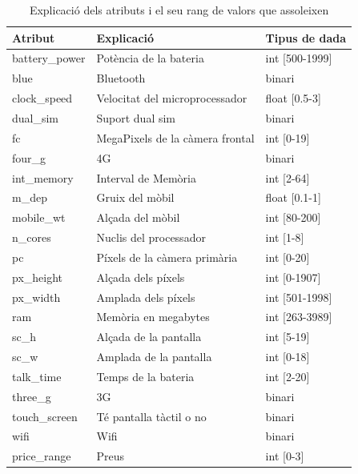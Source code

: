 \documentclass[a4paper, 11pt]{article}
\begin{document}
\begin{table}[h!]
    \centering
    \begin{tabular}{l|l|l}
        \textbf{Atribut} & \textbf{Explicació} & \textbf{Tipus de dada}\\\hline\hline
        battery\_power & Potència de la bateria & int [500-1999]\\\hline
        blue & Bluetooth & binari\\\hline
        clock\_speed & Velocitat del microprocessador & float [0.5-3] \\\hline
        dual\_sim & Suport dual sim &  binari \\\hline
        fc & MegaPixels de la càmera frontal & int [0-19] \\\hline
        four\_g & 4G & binari\\\hline
        int\_memory & Interval de Memòria & int [2-64] \\\hline
        m\_dep & Gruix del  mòbil & float [0.1-1] \\\hline
        mobile\_wt & Alçada del mòbil & int [80-200] \\\hline
        n\_cores & Nuclis del processador & int [1-8] \\\hline
        pc & Píxels de la càmera primària & int [0-20] \\\hline
        px\_height & Alçada dels píxels & int [0-1907] \\\hline
        px\_width & Amplada dels píxels & int [501-1998] \\\hline
        ram & Memòria en megabytes & int [263-3989] \\\hline
        sc\_h & Alçada de la pantalla & int [5-19] \\\hline
        sc\_w & Amplada de la pantalla & int [0-18] \\\hline
        talk\_time & Temps de la bateria  & int [2-20] \\\hline
        three\_g & 3G & binari \\\hline
        touch\_screen & Té pantalla tàctil o no & binari \\\hline
        wifi & Wifi & binari \\\hline
        price\_range & Preus & int [0-3] \\
    \end{tabular}
    \caption{Explicació dels atributs i el seu rang de valors que assoleixen}
    \label{explicació_atributs}
\end{table}
\hspace{-2.1 em}
\end{document}
